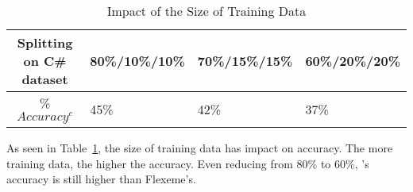 
\begin{table}[t]
\caption{Impact of the Size of Training Data}
	\vspace{-12pt}
	\tabcolsep 2pt
	\small
	\begin{center}
\begin{tabular}{|c|l|l|l|}
  \hline
  Splitting on C\# dataset & 80\%/10\%/10\% & 70\%/15\%/15\% & 60\%/20\%/20\% \\
  \hline
  \% $Accuracy^{c}$ & 45\% & 42\% & 37\% \\
  \hline
\end{tabular}
\label{splitting}
	\end{center}
\vspace{-3pt}
\end{table}

As seen in Table~\ref{splitting}, the size of training data has impact
on accuracy. The more training data, the higher the accuracy.  Even
reducing from 80\% to 60\%, {\tool}'s accuracy is still higher than
Flexeme's.
